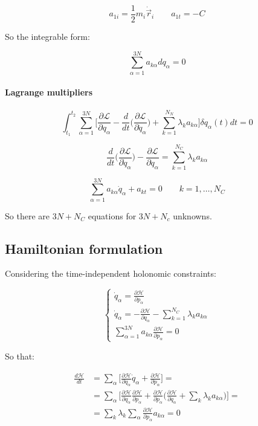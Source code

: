 		$$a_{1i}=\frac{1}{2}m_i\dot{\vec{r}}_i\qquad a_{1t} = -C$$

		So the integrable form:

		$$\sum\limits_{\alpha=1}^{3N}a_{k\alpha}dq_\alpha=0$$

			\paragraph{Lagrange multipliers}

			$$\int_{t_1}^{t_2}\sum\limits_{\alpha=1}^{3N}\biggl[\frac{\partial\mathcal{L}}{\partial q_\alpha} - \frac{d}{dt}\biggl(\frac{\partial\mathcal{L}}{\partial\dot{q}_\alpha}\biggr) + \sum\limits_{k=1}^{N_N}\lambda_ka_{k\alpha}\biggr]\delta q_\alpha(t)dt = 0$$

			$$\frac{d}{dt}\biggl(\frac{\partial\mathcal{L}}{\partial\dot{q}_\alpha}\biggr) - \frac{\partial\mathcal{L}}{\partial q_\alpha} = \sum\limits_{k=1}^{N_C}\lambda_k a_{k\alpha}$$

			$$\sum\limits_{\alpha=1}^{3N}a_{k\alpha}\dot{q}_\alpha + a_{kt} = 0\qquad k = 1, \dots, N_C$$

			So there are $3N+N_C$ equations for $3N+N_c$ unknowns.

	\subsection{Hamiltonian formulation}
	Considering the time-independent holonomic constraints:

	$$\begin{cases}\dot{q}_\alpha = \frac{\partial\mathcal{H}}{\partial p_\alpha}\\\dot{q}_\alpha = -\frac{\partial\mathcal{H}}{\partial q_\alpha} - \sum\limits_{k=1}^{N_C}\lambda_ka_{k\alpha}\\\sum\limits_{\alpha=1}^{3N}a_{k\alpha}\frac{\partial\mathcal{H}}{\partial p_\alpha} = 0\end{cases}$$

	So that:

	\begin{align*}
		\frac{d\mathcal{H}}{dt} &= \sum\limits_\alpha\biggl[\frac{\partial\mathcal{H}}{\partial q_\alpha}\dot{q}_\alpha +\frac{\partial\mathcal{H}}{\partial p_\alpha}\biggr] = \\
														&=\sum\limits_\alpha\biggl[\frac{\partial\mathcal{H}}{\partial q_\alpha}\frac{\partial\mathcal{H}}{\partial p_\alpha} + \frac{\partial\mathcal{H}}{\partial p_\alpha}\biggl(\frac{\partial\mathcal{H}}{\partial q_\alpha} + \sum\limits_k \lambda_ka_{k\alpha}\biggr)\biggr] = \\
														&=\sum\limits_k\lambda_k\sum\limits_\alpha\frac{\partial\mathcal{H}}{\partial p_\alpha}a_{k\alpha} = 0
	\end{align*}

